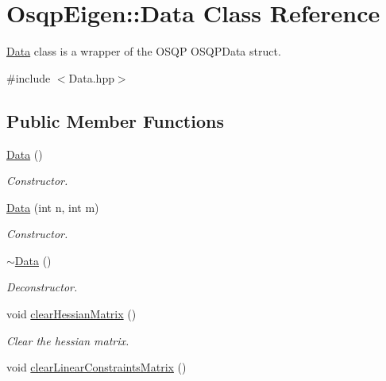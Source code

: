 \section{Osqp\+Eigen\+:\+:Data Class Reference}
\label{classOsqpEigen_1_1Data}


\hyperlink{classOsqpEigen_1_1Data}{Data} class is a wrapper of the O\+S\+QP O\+S\+Q\+P\+Data struct.  




{\ttfamily \#include $<$Data.\+hpp$>$}

\subsection*{Public Member Functions}
\begin{DoxyCompactItemize}
\item 
\hyperlink{classOsqpEigen_1_1Data_a3273d3a0bc715ebf8ec761de53b8c609}{Data} ()\label{classOsqpEigen_1_1Data_a3273d3a0bc715ebf8ec761de53b8c609}

\begin{DoxyCompactList}\small\item\em Constructor. \end{DoxyCompactList}\item 
\hyperlink{classOsqpEigen_1_1Data_abc922eb476cd94d8cff33b41aa540132}{Data} (int n, int m)
\begin{DoxyCompactList}\small\item\em Constructor. \end{DoxyCompactList}\item 
\hyperlink{classOsqpEigen_1_1Data_a470e51411686dc0c57ded9db7e67e9f7}{$\sim$\+Data} ()\label{classOsqpEigen_1_1Data_a470e51411686dc0c57ded9db7e67e9f7}

\begin{DoxyCompactList}\small\item\em Deconstructor. \end{DoxyCompactList}\item 
void \hyperlink{classOsqpEigen_1_1Data_ab66614fe057c238c53b3efcd546c96c0}{clear\+Hessian\+Matrix} ()\label{classOsqpEigen_1_1Data_ab66614fe057c238c53b3efcd546c96c0}

\begin{DoxyCompactList}\small\item\em Clear the hessian matrix. \end{DoxyCompactList}\item 
void \hyperlink{classOsqpEigen_1_1Data_a93b0b00a90c6fafd4fb8a23cb8553a0f}{clear\+Linear\+Constraints\+Matrix} ()\label{classOsqpEigen_1_1Data_a93b0b00a90c6fafd4fb8a23cb8553a0f}


\end{DoxyCompactItemize}
